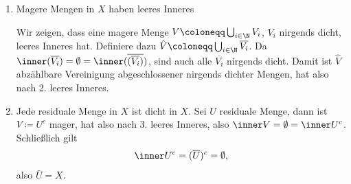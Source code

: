 \begin{beweis}
\begin{enumerate}
\item Magere Mengen in $X$ haben leeres Inneres

Wir zeigen, dass eine magere Menge $V \coloneqq \bigcup_{i \in \N} V_i$, $V_i$ nirgends dicht, leeres Inneres hat. Definiere dazu $\hat V \coloneqq \bigcup_{i \in \N} \overline{V_i} $. Da $\inner (\overline{V_i}) = \emptyset = \inner (\overline {(\overline{V_i})})$, sind auch alle $\overline{V_i}$ nirgends dicht. Damit ist $\hat V$ abzählbare Vereinigung abgeschlossener nirgends dichter Mengen, hat also nach 2. leeres Inneres.
\item Jede residuale Menge in $X$ ist dicht in $X$. Sei $U$ residuale Menge, dann ist $V \coloneqq U^c$ mager, hat also nach 3. leeres Inneres, also $\inner V = \emptyset = \inner U^c$. Schließlich gilt 
  \begin{align*}
    \inner U^c = (\overline{U})^c = \emptyset,
  \end{align*}
also $\bar U = X$.
  \end{enumerate}
\end{beweis}

